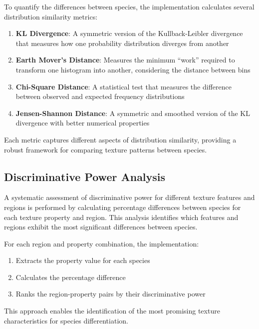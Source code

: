 \documentclass[a4paper,12pt]{report}
\begin{document}
To quantify the differences between species, the implementation calculates several distribution similarity metrics:

\begin{enumerate}
    \item \textbf{KL Divergence}: A symmetric version of the Kullback-Leibler divergence that measures how one probability distribution diverges from another

    \item \textbf{Earth Mover's Distance}: Measures the minimum ``work'' required to transform one histogram into another, considering the distance between bins

    \item \textbf{Chi-Square Distance}: A statistical test that measures the difference between observed and expected frequency distributions

    \item \textbf{Jensen-Shannon Distance}: A symmetric and smoothed version of the KL divergence with better numerical properties
\end{enumerate}

Each metric captures different aspects of distribution similarity, providing a robust framework for comparing texture patterns between species.

\subsection{Discriminative Power Analysis}

A systematic assessment of discriminative power for different texture features and regions is performed by calculating percentage differences between species for each texture property and region. This analysis identifies which features and regions exhibit the most significant differences between species.

For each region and property combination, the implementation:
\begin{enumerate}
    \item Extracts the property value for each species
    \item Calculates the percentage difference
    \item Ranks the region-property pairs by their discriminative power
\end{enumerate}

This approach enables the identification of the most promising texture characteristics for species differentiation.
\end{document}
